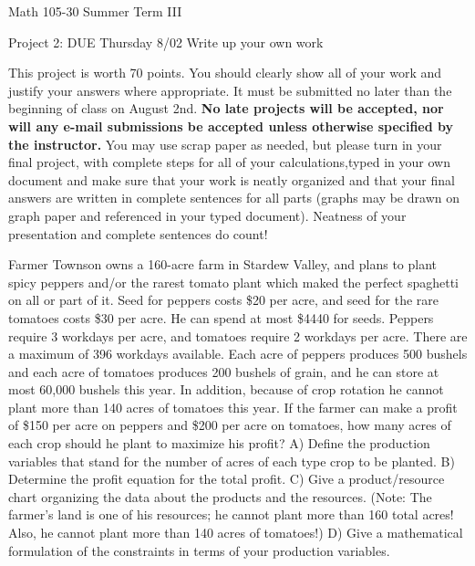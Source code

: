 \documentclass[11pt,epsfig]{article}
\begin{document}
Math 105-30 Summer Term III 

Project 2: DUE Thursday 8/02
\newline
Write up your own work
\vspace{1pc}

This project is worth 70 points. You should clearly show all of your work and justify your answers where appropriate. It must be submitted no later than the beginning of class on August 2nd. \textbf{No late projects will be accepted, nor will any e-mail submissions be accepted unless otherwise specified by the instructor.} You may use scrap paper as needed, but please turn in your final project, with complete steps for all of your calculations,typed in your own document and make sure that your work is neatly organized and that your final answers are written in complete sentences for all parts (graphs may be drawn on graph paper and referenced in your typed document). Neatness of your presentation and complete sentences do count! \bigskip
\vspace{0.5pc}






\begin{problem}{25}
Farmer Townson owns a 160-acre farm in Stardew Valley, and plans to plant spicy peppers and/or the rarest tomato plant which maked the perfect spaghetti on all or part of it. Seed for peppers costs \$20 per acre, and seed for the rare tomatoes costs \$30 per acre. He can spend at most \$4440 for seeds. Peppers require 3 workdays per acre, and tomatoes require 2 workdays per acre. There are a maximum of 396 workdays available. Each acre of peppers produces 500 bushels and each acre of tomatoes produces 200 bushels of grain, and he can store at most 60,000 bushels this year. In addition, because of crop rotation he cannot plant more than 140 acres of tomatoes this year. If the farmer can make a profit of \$150 per acre on peppers and \$200 per acre on tomatoes, how many acres of each crop should he plant to maximize his profit?
\newline
A) Define the production variables that stand for the number of acres of each type crop to be planted.
\newline
B) Determine the profit equation for the total profit.
\newline 
C) Give a product/resource chart organizing the data about the products and the resources.
(Note: The farmer’s land is one of his resources; he cannot plant more than 160 total acres!
Also, he cannot plant more than 140 acres of tomatoes!)
\newline
D) Give a mathematical formulation of the constraints in terms of your production variables.
\vfill
\end{problem}
\end{document}
